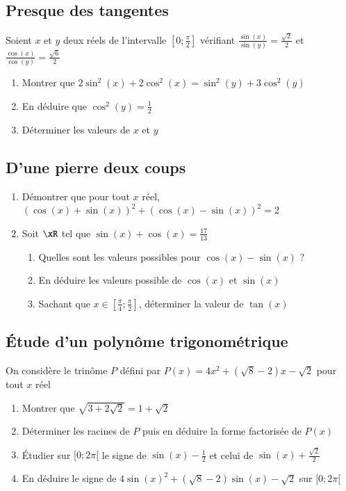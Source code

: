 \documentclass[oneside,12pt]{article}          %
\begin{document}
\subsection{Presque des tangentes}
Soient $x$ et $y$ deux réels de l'intervalle $\left[0;\frac{\pi}{2}\right]$ vérifiant $\frac{\sin(x)}{\sin(y)}=\frac{\sqrt{2}}{2}$ et $\frac{\cos(x)}{\cos(y)}=\frac{\sqrt{6}}{2}$
\begin{enumerate}
    \item Montrer que $2\sin^2(x)+2\cos^2(x)=\sin^2(y)+3\cos^2(y)$
    \item En déduire que $\cos^2(y)=\frac{1}{2}$
    \item Déterminer les valeurs de $x$ et $y$
\end{enumerate}



\subsection{D'une pierre deux coups}
\begin{enumerate}
    \item Démontrer que pour tout $x$ réel, $(\cos(x)+\sin(x))^2+(\cos(x)-\sin(x))^2=2$
    \item Soit $\xR$ tel que $\sin(x)+\cos(x)=\frac{17}{13}$
    \begin{enumerate}
        \item Quelles sont les valeurs possibles pour $\cos(x)-\sin(x)$ ?
        \item En déduire les valeurs possible de $\cos(x)$ et $\sin(x)$
        \item Sachant que $x\in\left[\frac{\pi}{4};\frac{\pi}{2}\right]$, déterminer la valeur de $\tan(x)$
    \end{enumerate}
\end{enumerate}



\subsection{Étude d'un polynôme trigonométrique}
On considère le trinôme $P$ défini par $P(x)=4x^2+(\sqrt{8}-2)x-\sqrt{2}$ pour tout $x$ réel
\begin{enumerate}
    \item Montrer que $\sqrt{3+2\sqrt{2}}=1+\sqrt{2}$
    \item Déterminer les racines de $P$ puis en déduire la forme factorisée de $P(x)$
    \item Étudier sur $[0;2\pi[$ le signe de $\sin(x)-\frac{1}{2}$ et celui de $\sin(x)+\frac{\sqrt{2}}{2}$
    \item En déduire le signe de $4\sin(x)^2+(\sqrt{8}-2)\sin(x)-\sqrt{2}$ sur $[0;2\pi[$
\end{enumerate}
\end{document}
